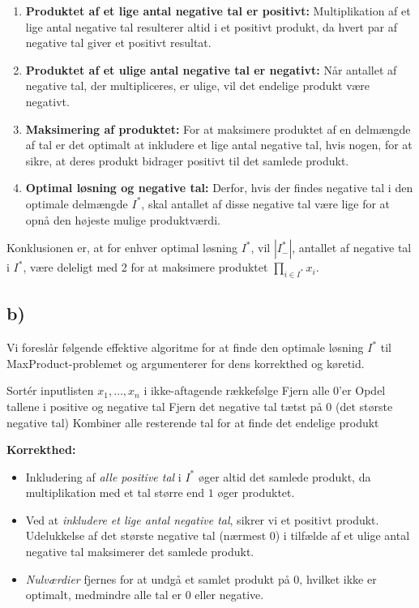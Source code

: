 \documentclass{article}
\begin{document}
\begin{enumerate}
    \item \textbf{Produktet af et lige antal negative tal er positivt:} Multiplikation af et lige antal negative tal resulterer altid i et positivt produkt, da hvert par af negative tal giver et positivt resultat.
    \item \textbf{Produktet af et ulige antal negative tal er negativt:} Når antallet af negative tal, der multipliceres, er ulige, vil det endelige produkt være negativt.
    \item \textbf{Maksimering af produktet:} For at maksimere produktet af en delmængde af tal er det optimalt at inkludere et lige antal negative tal, hvis nogen, for at sikre, at deres produkt bidrager positivt til det samlede produkt.
    \item \textbf{Optimal løsning og negative tal:} Derfor, hvis der findes negative tal i den optimale delmængde $I^*$, skal antallet af disse negative tal være lige for at opnå den højeste mulige produktværdi.
\end{enumerate}

Konklusionen er, at for enhver optimal løsning $I^*$, vil $\left|I_{-}^*\right|$, antallet af negative tal i $I^*$, være deleligt med 2 for at maksimere produktet $\prod_{i \in I^*} x_i$.


\subsection*{b)}

Vi foreslår følgende effektive algoritme for at finde den optimale løsning $I^*$ til MaxProduct-problemet og argumenterer for dens korrekthed og køretid.

\begin{algorithm}
\caption{Find den optimale løsning til MaxProduct-problemet}
\begin{algorithmic}
\STATE Sortér inputlisten $x_1, \ldots, x_n$ i ikke-aftagende rækkefølge
    \STATE Fjern alle $0$’er
\ENDIF
\STATE Opdel tallene i positive og negative tal
    \STATE Fjern det negative tal tætst på $0$ (det største negative tal)
\ENDIF
\STATE Kombiner alle resterende tal for at finde det endelige produkt
\end{algorithmic}
\end{algorithm}

\textbf{Korrekthed:}
\begin{itemize}
    \item Inkludering af \textit{alle positive tal} i $I^*$ øger altid det samlede produkt, da multiplikation med et tal større end $1$ øger produktet.
    \item Ved at \textit{inkludere et lige antal negative tal}, sikrer vi et positivt produkt. Udelukkelse af det største negative tal (nærmest $0$) i tilfælde af et ulige antal negative tal maksimerer det samlede produkt.
    \item \textit{Nulværdier} fjernes for at undgå et samlet produkt på $0$, hvilket ikke er optimalt, medmindre alle tal er $0$ eller negative.
\end{itemize}
\end{document}
